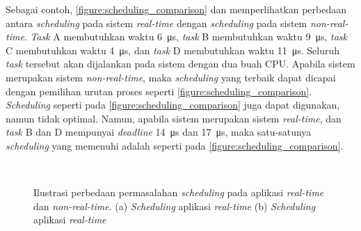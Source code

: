 Sebagai contoh, \autoref{figure:scheduling_comparison} dan  memperlihatkan perbedaan antara \textit{scheduling} pada sistem \textit{real-time} dengan \textit{scheduling} pada sistem \textit{non-real-time}.
\textit{Task} A membutuhkan waktu \SI{6}{\micro\second}, \textit{task} B membutuhkan waktu \SI{9}{\micro\second}, \textit{task} C membutuhkan waktu \SI{4}{\micro\second}, dan \textit{task} D membutuhkan waktu \SI{11}{\micro\second}.
Seluruh \textit{task} tersebut akan dijalankan pada sistem dengan dua buah CPU.
Apabila sistem merupakan sistem \textit{non-real-time}, maka \textit{scheduling} yang terbaik dapat dicapai dengan pemilihan urutan proses seperti \autoref{figure:scheduling_comparison}.
\textit{Scheduling} seperti pada \autoref{figure:scheduling_comparison} juga dapat digunakan, namun tidak optimal.
Namun, apabila sistem merupakan sistem \textit{real-time}, dan \textit{task} B dan D mempunyai \textit{deadline} \SI{14}{\micro\second} dan \SI{17}{\micro\second}, maka satu-satunya \textit{scheduling} yang memenuhi adalah seperti pada \autoref{figure:scheduling_comparison}.

\begin{figure}[htbp]
    \centering
    \vspace{18pt}
    \\
    \vspace{18pt}\hspace{24pt}
    \caption[Ilustrasi perbedaan permasalahan \textit{scheduling} pada aplikasi \textit{real-time} dan \textit{non-real-time}]{Ilustrasi perbedaan permasalahan \textit{scheduling} pada aplikasi \textit{real-time} dan \textit{non-real-time}. (a) \textit{Scheduling} aplikasi \textit{real-time} (b) \textit{Scheduling} aplikasi \textit{real-time}}
    \label{figure:scheduling_comparison}
\end{figure}

